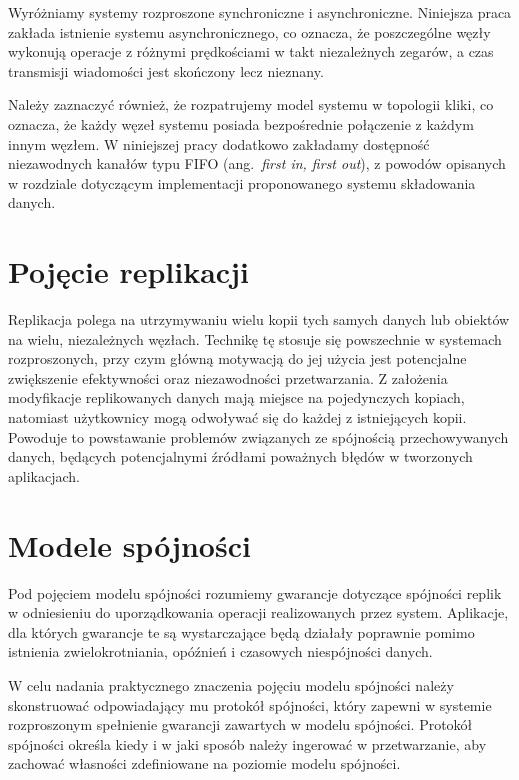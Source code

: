 Wyróżniamy systemy rozproszone synchroniczne i asynchroniczne. Niniejsza praca zakłada istnienie systemu asynchronicznego, co oznacza, że poszczególne węzły wykonują operacje z różnymi prędkościami w takt niezależnych zegarów, a czas transmisji wiadomości jest skończony lecz nieznany.

Należy zaznaczyć również, że rozpatrujemy model systemu w topologii kliki, co oznacza, że każdy
węzeł systemu posiada bezpośrednie połączenie z każdym innym węzłem. W niniejszej pracy dodatkowo
zakładamy dostępność niezawodnych kanałów typu FIFO (ang.\ \textit{first in, first out}), z powodów opisanych w rozdziale dotyczącym implementacji proponowanego systemu składowania danych.

\section{Pojęcie replikacji}


Replikacja polega na utrzymywaniu wielu kopii tych samych danych lub obiektów na wielu, niezależnych węzłach. Technikę tę stosuje się powszechnie w systemach rozproszonych, przy czym główną motywacją do jej użycia jest potencjalne zwiększenie efektywności oraz niezawodności przetwarzania. Z założenia modyfikacje replikowanych danych mają miejsce na pojedynczych kopiach, natomiast użytkownicy mogą odwoływać się do każdej z istniejących kopii. Powoduje to powstawanie problemów związanych ze spójnością przechowywanych danych, będących potencjalnymi źródłami poważnych błędów w tworzonych aplikacjach.

\section{Modele spójności}


Pod pojęciem modelu spójności rozumiemy gwarancje dotyczące spójności replik w odniesieniu do uporządkowania operacji realizowanych przez system. Aplikacje, dla których gwarancje te są wystarczające będą działały poprawnie pomimo istnienia zwielokrotniania, opóźnień i czasowych niespójności danych.

W celu nadania praktycznego znaczenia pojęciu modelu spójności należy skonstruować odpowiadający mu protokół spójności, który zapewni w systemie rozproszonym spełnienie gwarancji zawartych w modelu spójności. Protokół spójności określa kiedy i w jaki sposób należy ingerować w przetwarzanie, aby zachować własności zdefiniowane na poziomie modelu spójności.

